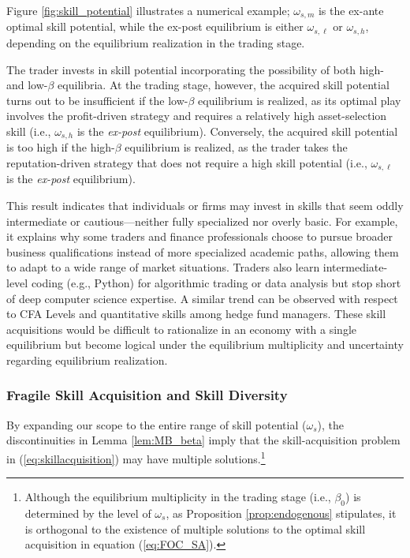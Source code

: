 Figure \ref{fig:skill_potential} illustrates a numerical example; $\omega_{s,m}$ is the ex-ante optimal skill potential, while the ex-post equilibrium is either $\omega_{s,\ell}$ or $\omega_{s,h}$, depending on the equilibrium
realization in the trading stage.

The trader invests in skill potential incorporating the possibility of both high- and low-$\beta$ equilibria. At the trading 
stage, however, the acquired skill potential turns out to be insufficient if the low-$\beta$ equilibrium is realized, as its optimal play involves the profit-driven strategy and requires a relatively high asset-selection skill (i.e., $\omega_{s,h}$ is the \textit{ex-post} equilibrium). Conversely, the acquired skill potential is too high if the high-$\beta$ equilibrium is realized, as the trader takes the reputation-driven strategy that does not require a high skill potential (i.e., $\omega_{s,\ell}$ is the \textit{ex-post} equilibrium). 

This result indicates that individuals or firms may invest in skills that seem oddly intermediate or cautious—neither fully specialized nor overly basic. For example, it explains why some traders and finance professionals choose to pursue broader business qualifications instead of more specialized academic paths, allowing them to adapt to a wide range of market situations. Traders also learn intermediate-level coding (e.g., Python) for algorithmic trading or data analysis but stop short of deep computer science expertise. A similar trend can be observed with respect to CFA Levels and quantitative skills among hedge fund managers. These skill acquisitions would be difficult to rationalize in an economy with a single equilibrium but become logical under the equilibrium multiplicity and uncertainty regarding equilibrium realization. 

\subsubsection{Fragile Skill Acquisition and Skill Diversity}
By expanding our scope to the entire range of skill potential ($\omega_{s}$), the discontinuities in Lemma \ref{lem:MB_beta} imply that the skill-acquisition problem in (\ref{eq:skillacquisition}) may have multiple solutions.\footnote{Although the equilibrium multiplicity in the trading stage (i.e., $\beta_{0}$) is determined by the level of $\omega_{s}$, as Proposition \ref{prop:endogenous} stipulates, it is orthogonal to the existence of multiple solutions to the optimal skill acquisition in equation (\ref{eq:FOC_SA}).} 

